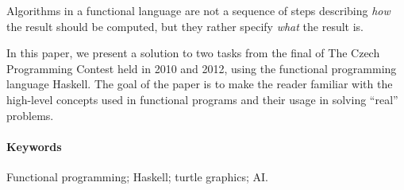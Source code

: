 \begin{adjustwidth}{1.5cm}{1.5cm}
Algorithms in a functional language are not a sequence of steps describing
\emph{how} the result should be computed, but they rather specify \emph{what}
the result is.

In this paper, we present a solution to two tasks from the final of The Czech
Programming Contest held in 2010 and 2012, using the functional programming
language Haskell. The goal of the paper is to make the reader familiar with the
high-level concepts used in functional programs and their usage in solving
``real'' problems.


\paragraph*{Keywords}
Functional programming; Haskell; turtle graphics; AI.

\end{adjustwidth}
